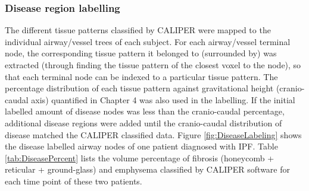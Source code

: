 \subsubsection{Disease region labelling}
The different tissue patterns classified by CALIPER were mapped to the individual airway/vessel trees of each subject. For each airway/vessel terminal node, the corresponding tissue pattern it belonged to (surrounded by) was extracted (through finding the tissue pattern of the closest voxel to the node), so that each terminal node can be indexed to a particular tissue pattern. The percentage distribution of each tissue pattern against gravitational height (cranio-caudal axis) quantified in Chapter 4 was also used in the labelling. If the initial labelled amount of disease nodes was less than the cranio-caudal percentage, additional disease regions were added until the cranio-caudal distribution of disease matched the CALIPER classified data. Figure \ref{fig:DiseaseLabeling} shows the disease labelled airway nodes of one patient diagnosed with IPF. Table \ref{tab:DiseasePercent} lists the volume percentage of fibrosis (honeycomb + reticular + ground-glass) and emphysema classified by CALIPER software for each time point of these two patients.


